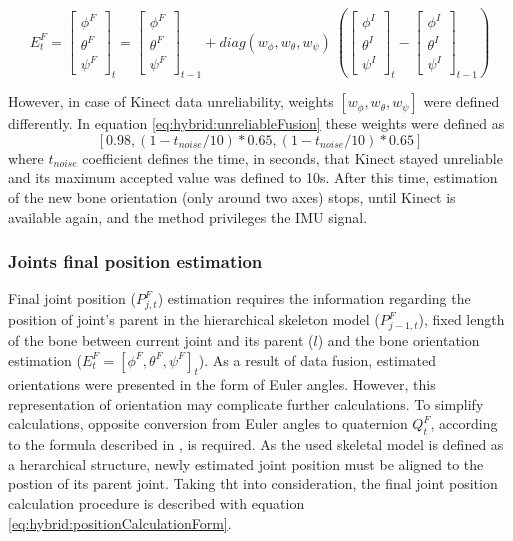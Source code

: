 \documentclass[sensors,article,submit,moreauthors,pdftex,10pt,a4paper]{mdpi}
\begin{document}
		
	\begin{equation} 
		\label{eq:hybrid:unreliableFusion}
		E^F_t = 
		\begin{bmatrix}  \phi^F \\  \theta^F \\  \psi^F \end{bmatrix}_t = 
		\begin{bmatrix}  \phi^F \\  \theta^F \\  \psi^F \end{bmatrix}_{t-1} +
		diag(w_\phi,w_\theta,w_\psi)\
		(\begin{bmatrix}  \phi^I \\  \theta^I \\  \psi^I \end{bmatrix}_t -
		\begin{bmatrix}  \phi^I \\  \theta^I \\  \psi^I \end{bmatrix}_{t-1})
	\end{equation}
		
	However, in case of Kinect data unreliability, weights $[w_\phi , w_\theta , w_\psi]$ were defined differently. In equation \ref{eq:hybrid:unreliableFusion} these weights were defined as $$[0.98,(1-t_{noise}/10)*0.65,(1-t_{noise}/10)*0.65]$$ where $t_{noise}$ coefficient defines the time, in seconds, that Kinect stayed unreliable and its maximum accepted value was defined to 10s. After this time, estimation of the new bone orientation (only around two axes) stops, until Kinect is available again, and the method privileges the IMU signal.
		
	\subsubsection{Joints final position estimation}
	Final joint position ($P_{j,t}^F$) estimation requires the information regarding the position of joint’s parent in the hierarchical skeleton model ($P_{j-1,t}^F$), fixed length of the bone between current joint and its parent ($l$) and the bone orientation estimation ($E_t^F=[\phi^F,\theta^F,\psi^F]_t$). As a result of data fusion, estimated orientations were presented in the form of Euler angles. However, this representation of orientation may complicate further calculations. To simplify calculations, opposite conversion from Euler angles to quaternion $Q_t^F$, according to the formula described in \cite{Dunn2011}, is required. As the used skeletal model is defined as a herarchical structure, newly estimated joint position must be aligned to the postion of its parent joint. Taking tht into consideration, the final joint position calculation procedure is described with equation \ref{eq:hybrid:positionCalculationForm}.
		
\end{document}
